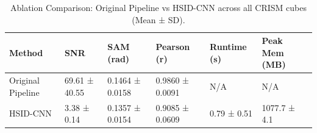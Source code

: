 \begin{table}
\caption{Ablation Comparison: Original Pipeline vs HSID-CNN across all CRISM cubes (Mean ± SD).}
\label{tab:comparison}
\begin{tabular}{llllll}
\toprule
Method & SNR & SAM (rad) & Pearson (r) & Runtime (s) & Peak Mem (MB) \\
\midrule
Original Pipeline & 69.61 ± 40.55 & 0.1464 ± 0.0158 & 0.9860 ± 0.0091 & N/A & N/A \\
HSID-CNN & 3.38 ± 0.14 & 0.1357 ± 0.0154 & 0.9085 ± 0.0609 & 0.79 ± 0.51 & 1077.7 ± 4.1 \\
\bottomrule
\end{tabular}
\end{table}
